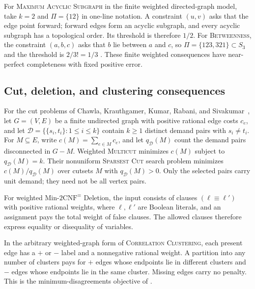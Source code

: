For \textsc{Maximum Acyclic Subgraph} in the finite weighted
directed-graph model, take \(k=2\) and \(\Pi=\{12\}\) in one-line
notation. A constraint \((u,v)\) asks that the edge point forward;
forward edges form an acyclic subgraph, and every acyclic subgraph has
a topological order. Its threshold is therefore \(1/2\).
For \textsc{Betweenness}, the constraint \((a,b,c)\) asks that \(b\)
lie between \(a\) and \(c\), so \(\Pi=\{123,321\}\subset S_3\) and
the threshold is \(2/3!=1/3\)
\cite[Theorem~1.1 and Section~1.2]{GuruswamiEtAl2011OrderingCSP}.
These finite weighted consequences have near-perfect completeness
with fixed positive error.

\subsection{Cut, deletion, and clustering consequences}

For the cut problems of Chawla, Krauthgamer, Kumar, Rabani, and
Sivakumar~\cite[Section~1]{CKKRS2006}, let \(G=(V,E)\) be a finite
undirected graph with positive rational edge costs \(c_e\), and let
\(\mathcal D=\{\{s_i,t_i\}:1\le i\le k\}\) contain \(k\ge1\)
distinct demand pairs with \(s_i\ne t_i\). For \(M\subseteq E\), write
\(c(M)=\sum_{e\in M}c_e\), and let \(q_{\mathcal D}(M)\) count
the demand pairs disconnected in \(G-M\).
Weighted \textsc{Multicut} minimizes \(c(M)\) subject to
\(q_{\mathcal D}(M)=k\). Their nonuniform \textsc{Sparsest Cut}
search problem minimizes \(c(M)/q_{\mathcal D}(M)\) over cutsets
\(M\) with \(q_{\mathcal D}(M)>0\). Only the selected pairs carry
unit demand; they need not be all vertex pairs.

For weighted Min-\(2\mathrm{CNF}^{\equiv}\) Deletion, the input
consists of clauses \((\ell\equiv\ell')\) with positive rational
weights, where \(\ell,\ell'\) are Boolean literals, and an assignment
pays the total weight of false clauses. The allowed clauses therefore
express equality or disequality of variables.

In the arbitrary weighted-graph form of \textsc{Correlation Clustering},
each present edge has a \(+\) or \(-\) label and a nonnegative rational
weight. A partition into any number of clusters pays for \(+\) edges
whose endpoints lie in different clusters and \(-\) edges whose
endpoints lie in the same cluster. Missing edges carry no penalty.
This is the minimum-disagreements objective of
\cite[Section~2.1]{DemaineEtAl2006Clustering}.

